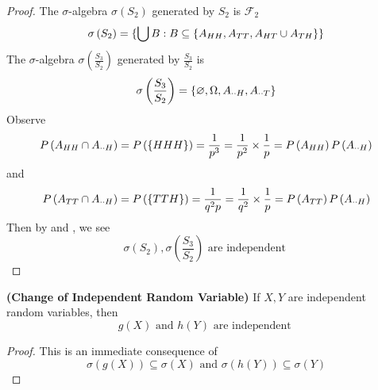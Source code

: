 \documentclass{report}
\begin{document}
\begin{proof}
The $\sigma$-algebra $\sigma\left(S_2 \right)$ generated by $S_2$ is $\mathcal{F}_2$
\begin{equation*}
\sigma\left(S_2 \right)=\{ \bigcup B:B\subseteq \{ A_{HH},A_{TT},A_{HT}\cup A_{TH} \} \}
\end{equation*}
The $\sigma$-algebra $\sigma\left(\frac{S_3}{S_2} \right)$ generated by $\frac{S_3}{S_2}$ is 
\begin{equation*}
\sigma\left(\frac{S_3}{S_2} \right)=\{ \varnothing,\Omega, A_{\cdot \cdot H},A_{\cdot \cdot T} \}
\end{equation*}
Observe 
\begin{equation*}
P\left(A_{HH}\cap  A_{\cdot \cdot H} \right)=P\left(\{ HHH \} \right)=\frac{1}{p^3}=\frac{1}{p^2}\times \frac{1}{p}=P\left(A_{HH} \right)P\left(A_{\cdot \cdot H} \right)
\end{equation*}
and 
\begin{equation*}
P\left(A_{TT}\cap A_{\cdot \cdot H} \right)=P\left(\{ TTH \} \right)=\frac{1}{q^2p}=\frac{1}{q^2}\times \frac{1}{p}=P\left(A_{TT} \right)P\left(A_{\cdot \cdot H} \right)
\end{equation*}
Then by  and , we see 
\begin{equation*}
\sigma \left(S_2 \right),\sigma \left(\frac{S_3}{S_2} \right)\text{ are independent }
\end{equation*}
\end{proof}
\begin{theorem}
\label{3.2.3}
\textbf{(Change of Independent Random Variable)} If $X,Y$ are independent random variables, then 
\begin{equation*}
g\left(X \right)\text{ and }h\left(Y \right)\text{ are independent }
\end{equation*}
\end{theorem}
\begin{proof}
This is an immediate consequence of 
\begin{equation*}
\sigma \left(g\left(X \right) \right)\subseteq \sigma \left(X \right)\text{ and }\sigma \left(h\left(Y \right) \right)\subseteq \sigma \left(Y \right)
\end{equation*}
\end{proof}
\end{document}
